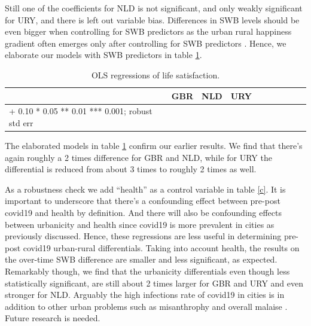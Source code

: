 \documentclass[10pt, letterpaper]{article}
\begin{document}
\begin{spacing}{1.4}
Still one of the coefficients for NLD is not significant, and only weakly
significant for URY, and there is left out variable bias. {Differences in SWB levels should be even bigger when controlling for SWB predictors as the urban rural happiness gradient often emerges only after controlling for SWB predictors \citep{aok21}.} Hence, we elaborate our models with SWB predictors in table \ref{b}.


\begin{spacing}{.9} \begin{table}[H]\centering   \begin{scriptsize} \begin{tabular}{p{1.8in}p{.5in}p{.5in}|p{.5in}p{.5in}|p{.5in}p{.5in}|p{.5in}p{.5in}p{.5in}p{.5 in}p{.5in}p{.5 in}}\hline\hline&\multicolumn{2}{c}{GBR}&\multicolumn{2}{c}{NLD}&\multicolumn{2}{c}{URY}\\  \hline + 0.10 * 0.05 ** 0.01 *** 0.001; robust std err \end{tabular}\end{scriptsize}\caption{\label{b}OLS regressions of life satisfaction.}\end{table} \end{spacing}

The elaborated models in table \ref{b} confirm our earlier results. We find that there's again roughly a 2 times difference for GBR and NLD, while for URY the differential is reduced from about 3 times to roughly 2 times as well. 

As a robustness check we add ``health'' as a control variable in table \ref{c}. It is important to underscore that there's a confounding effect between pre-post covid19 and health by definition. And there will also be confounding effects between urbanicity and health since covid19 is more prevalent in cities as previously discussed.  Hence, these regressions are less useful in determining pre-post covid19 urban-rural differentials. Taking into account health, the results on the over-time SWB difference are smaller and less significant, as expected.
Remarkably though, we find that the urbanicity differentials even
though less statistically significant, are still about 2 times larger for GBR
and URY and even stronger for NLD. Arguably the high infections rate of covid19
in cities is in addition to other urban problems such as misanthrophy and
overall malaise \citep{aok22,wilson85,rosenberg56,aok-swbGenYcity18,fischer73,fischer76}. Future research is needed. 


\end{spacing}
\end{document}
